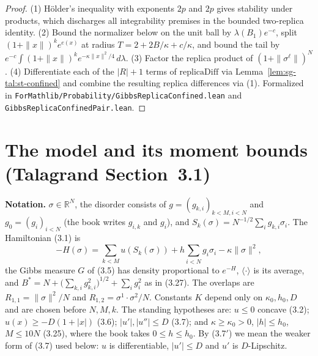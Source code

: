 \begin{proof}
  \leanok
(1) H\"older's inequality with exponents $2p$ and $2p$ gives stability under products, which discharges all
integrability premises in the bounded two-replica identity. (2) Bound the normalizer below on the unit ball by
$\lambda(B_1)e^{-c}$, split $(1+\|x\|)^ke^{e(x)}$ at radius $T=2+2B/\kappa+c/\kappa$, and bound the tail by
$e^{-c}\int(1+\|x\|)^ke^{-\kappa\|x\|^2/4}\,d\lambda$. (3) Factor the replica product of $(1+\|\sigma^\ell\|)^N$.
(4) Differentiate each of the $|R|+1$ terms of $\mathrm{replicaDiff}$ via Lemma~\ref{lem:sg-tal:st-confined} and
combine the resulting replica differences via (1). Formalized in
\texttt{ForMathlib/Probability/GibbsReplicaConfined.lean} and \texttt{GibbsReplicaConfinedPair.lean}.
\end{proof}

\section{The model and its moment bounds (Talagrand Section~3.1)}\label{sec:sg-tal:st-model}

\medskip\noindent\textbf{Notation.} $\sigma\in\mathbb R^N$, the disorder consists of
$g=(g_{k,i})_{k<M,i<N}$ and $g_0=(g_i)_{i<N}$ (the book writes $g_{i,k}$ and $g_i$), and
$S_k(\sigma)=N^{-1/2}\sum_ig_{k,i}\sigma_i$. The Hamiltonian (3.1) is
\[
-H(\sigma)=\sum_{k<M}u(S_k(\sigma))+h\sum_{i<N}g_i\sigma_i-\kappa\|\sigma\|^2,
\]
the Gibbs measure $G$ of (3.5) has density proportional to $e^{-H}$, $\langle\cdot\rangle$ is its average,
and $B^*=N+\bigl(\sum_{k,i}g_{k,i}^2\bigr)^{1/2}+\sum_ig_i^2$ as in (3.27). The overlaps are
$R_{1,1}=\|\sigma\|^2/N$ and $R_{1,2}=\sigma^1\cdot\sigma^2/N$. Constants $K$ depend only on
$\kappa_0,h_0,D$ and are chosen before $N,M,k$. The standing hypotheses are: $u\le0$ concave (3.2);
$u(x)\ge-D(1+|x|)$ (3.6); $|u'|,|u''|\le D$ (3.7); and $\kappa\ge\kappa_0>0$, $|h|\le h_0$, $M\le10N$
(3.25), where the book takes $0\le h\le h_0$. By (3.7$'$) we mean the weaker form of (3.7) used below: $u$ is
differentiable, $|u'|\le D$ and $u'$ is $D$-Lipschitz.

